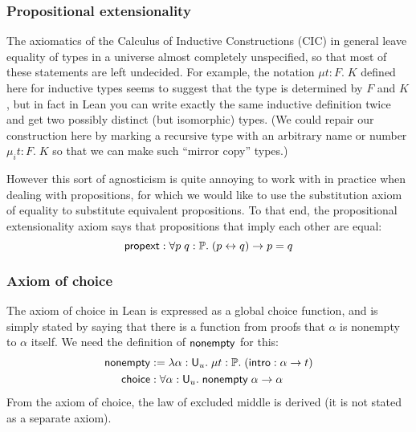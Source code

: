 \subsubsection{Propositional extensionality}
The axiomatics of the Calculus of Inductive Constructions (CIC) in general leave equality of types in a universe almost completely unspecified, so that most of these statements are left undecided. For example, the notation $\mu t:F.\;K$ defined here for inductive types seems to suggest that the type is determined by $F$ and $K$, but in fact in Lean you can write exactly the same inductive definition twice and get two possibly distinct (but isomorphic) types. (We could repair our construction here by marking a recursive type with an arbitrary name or number $\mu_i t:F.\;K$ so that we can make such ``mirror copy'' types.)

However this sort of agnosticism is quite annoying to work with in practice when dealing with propositions, for which we would like to use the substitution axiom of equality to substitute equivalent propositions. To that end, the propositional extensionality axiom says that propositions that imply each other are equal:
$$\mathsf{propext}:\forall p\;q:\P.\;(p\leftrightarrow q)\to p=q$$

\subsubsection{Axiom of choice}
The axiom of choice in Lean is expressed as a global choice function, and is simply stated by saying that there is a function from proofs that $\alpha$ is nonempty to $\alpha$ itself. We need the definition of $\nonempty$ for this:
\begin{align*}
\nonempty&:=\lambda\alpha:\U_u.\;\mu t:\P.\;(\intro:\alpha\to t)\\
\mathsf{choice}&:\forall\alpha:\U_u.\;\nonempty\;\alpha\to\alpha
\end{align*}
From the axiom of choice, the law of excluded middle is derived (it is not stated as a separate axiom).
